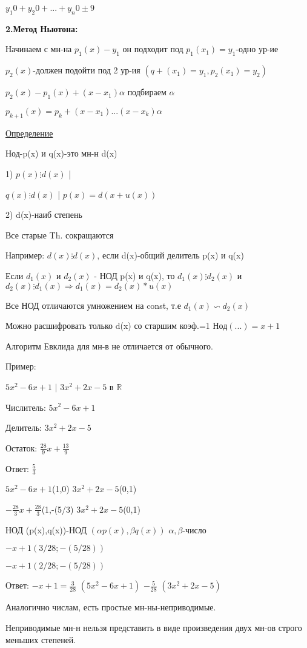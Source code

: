 \documentclass{article}
\begin{document}
$y_{1}0+y_{2}0+...+y_{n}0\pm9$

\textbf{2.Метод Ньютона:}

Начинаем с мн-на $p_1(x)-y_1$ он подходит под $p_1(x_1)=y_1$-одно ур-ие

$p_2(x)$-должен подойти под 2 ур-ия $(q+(x_1)=y_1,p_2(x_1)=y_2)$

$p_2(x)-p_1(x)+(x-x_1)\alpha$ подбираем $\alpha$

$p_{k+1}(x)=p_{k}+(x-x_1)...(x-x_k)\alpha$

\underline{Определение}

Нод-p(x) и q(x)-это мн-н d(x)

1) $p(x)\vdots d(x)$ |

   $q(x)\vdots d(x)$ | $p(x)=d(x+u(x))$

2) d(x)-наиб степень

Все старые Th. сокращаются

Например: $d(x)\vdots d(x)$, если d(x)-общий делитель p(x) и q(x)

Если $d_1(x)$ и $d_2(x)$ - НОД p(x) и q(x), то $d_1(x)\vdots d_2(x)$ и 
$d_2(x)\vdots d_1(x) \Rightarrow d_1(x)=d_2(x)*u(x)$

Все НОД отличаются умножением на const, т.е $d_1(x)\backsim d_2(x)$

Можно расшифровать только d(x) со старшим коэф.=1 Нод$(...)=x+1$

Алгоритм Евклида для мн-в не отличается от обычного.

Пример: 

$5x^2-6x+1$ $|$ $3x^2+2x-5$ в $\mathds{R}$

Числитель: $5x^2-6x+1$

Делитель: $3x^2+2x-5$

Остаток: $\frac{28}{9}x+\frac{13}{9}$

Ответ: $\frac{5}{3}$

$5x^2-6x+1$(1,0) $3x^2+2x-5$(0,1)

$-\frac{28}{3}x+\frac{28}{3}$(1,-(5/3) $3x^2+2x-5$(0,1)

НОД (p(x),q(x))-НОД $(\alpha p(x),\beta q(x))$ $\alpha,\beta$-число

$-x+1(3/28;-(5/28))$

$-x+1(2/28;-(5/28))$

Ответ: $-x+1=\frac{3}{28}$ $(5x^2-6x+1)$ $-\frac{5}{28}$ $(3x^2+2x-5)$

Аналогично числам, есть простые мн-ны-неприводимые.

Неприводимые мн-н нельзя представить в виде произведения двух мн-ов строго меньших степеней. 
\end{document}
